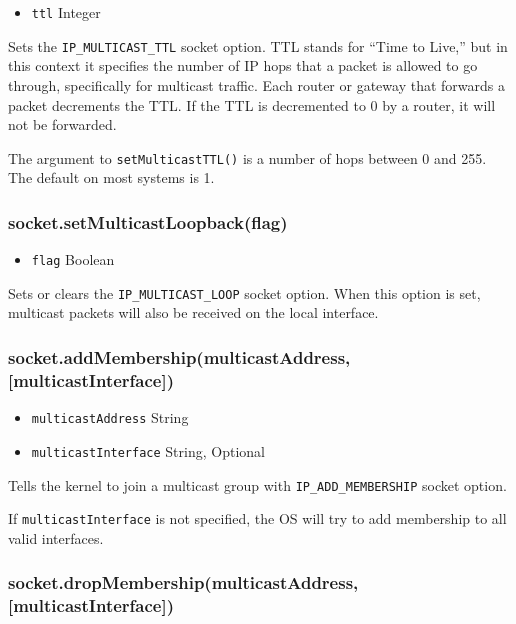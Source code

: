 \begin{itemize}
\item
  \texttt{ttl} Integer
\end{itemize}

Sets the \texttt{IP\_MULTICAST\_TTL} socket option. TTL stands for
``Time to Live,'' but in this context it specifies the number of IP hops
that a packet is allowed to go through, specifically for multicast
traffic. Each router or gateway that forwards a packet decrements the
TTL. If the TTL is decremented to 0 by a router, it will not be
forwarded.

The argument to \texttt{setMulticastTTL()} is a number of hops between 0
and 255. The default on most systems is 1.

\subsubsection{socket.setMulticastLoopback(flag)}

\begin{itemize}
\item
  \texttt{flag} Boolean
\end{itemize}

Sets or clears the \texttt{IP\_MULTICAST\_LOOP} socket option. When this
option is set, multicast packets will also be received on the local
interface.

\subsubsection{socket.addMembership(multicastAddress,
{[}multicastInterface{]})}

\begin{itemize}
\item
  \texttt{multicastAddress} String
\item
  \texttt{multicastInterface} String, Optional
\end{itemize}

Tells the kernel to join a multicast group with
\texttt{IP\_ADD\_MEMBERSHIP} socket option.

If \texttt{multicastInterface} is not specified, the OS will try to add
membership to all valid interfaces.

\subsubsection{socket.dropMembership(multicastAddress,
{[}multicastInterface{]})}

